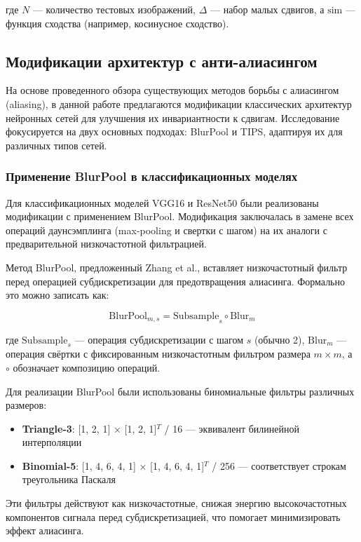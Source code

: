 где $N$ — количество тестовых изображений, $\Delta$ — набор малых сдвигов, а $\text{sim}$ — функция сходства (например, косинусное сходство).

\subsection{Модификации архитектур с анти-алиасингом}
\label{sec:architectures}

На основе проведенного обзора существующих методов борьбы с алиасингом (aliasing), в данной работе предлагаются модификации классических архитектур нейронных сетей для улучшения их инвариантности к сдвигам. Исследование фокусируется на двух основных подходах: BlurPool и TIPS, адаптируя их для различных типов сетей.

\subsubsection{Применение BlurPool в классификационных моделях}
\label{sec:architectures:blurpool_classification}

Для классификационных моделей VGG16 и ResNet50 были реализованы модификации с применением BlurPool. Модификация заключалась в замене всех операций даунсэмплинга (max-pooling и свертки с шагом) на их аналоги с предварительной низкочастотной фильтрацией.

Метод BlurPool, предложенный Zhang et al., вставляет низкочастотный фильтр перед операцией субдискретизации для предотвращения алиасинга. Формально это можно записать как:

$$\text{BlurPool}_{m,s} = \text{Subsample}_{s} \circ \text{Blur}_{m}$$

где $\text{Subsample}_{s}$ — операция субдискретизации с шагом $s$ (обычно 2), $\text{Blur}_{m}$ — операция свёртки с фиксированным низкочастотным фильтром размера $m \times m$, а $\circ$ обозначает композицию операций.

Для реализации BlurPool были использованы биномиальные фильтры различных размеров:
\begin{itemize}
    \item \textbf{Triangle-3}: [1, 2, 1] × [1, 2, 1]$^{T}$ / 16 — эквивалент билинейной интерполяции
    \item \textbf{Binomial-5}: [1, 4, 6, 4, 1] × [1, 4, 6, 4, 1]$^{T}$ / 256 — соответствует строкам треугольника Паскаля
\end{itemize}

Эти фильтры действуют как низкочастотные, снижая энергию высокочастотных компонентов сигнала перед субдискретизацией, что помогает минимизировать эффект алиасинга.


